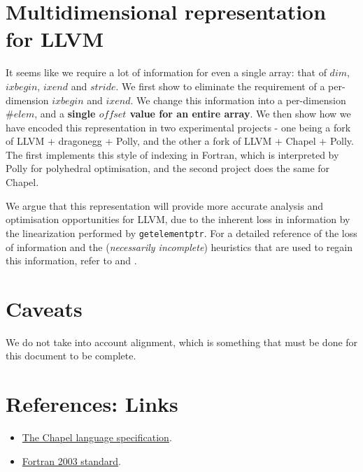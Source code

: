 \documentclass{article}
\newcommand{\gep}{\texttt{getelementptr}}
\begin{document}
\section{Multidimensional representation for LLVM}
It seems like we require a lot of information for even a single array:
that of $dim$, $ixbegin$, $ixend$ and $stride$.  We first show
to eliminate the requirement of a per-dimension $ixbegin$ and $ixend$. We
change this information into a per-dimension $\#elem$, and a 
\textbf{single $offset$ value for an entire array}. We then show
how we have encoded this representation in two experimental projects -
one being a fork of LLVM + dragonegg + Polly, and the other a fork of
LLVM + Chapel + Polly. The first implements this style of indexing in Fortran,
which is interpreted by Polly for polyhedral optimisation, and the second
project does the same for Chapel.

We argue that this representation will provide more accurate analysis and
optimisation opportunities for LLVM, due to the inherent loss in information
by the linearization performed by \gep. For a detailed reference of 
the loss of information and the (\textit{necessarily incomplete}) heuristics
that are used to regain this information, refer to \cite{grosser2015optimistic}
and \cite{maslov1992delinearization}.




\section{Caveats}
We do not take into account alignment, which is something that must be done
for this document to be complete.

\section{References: Links}

\begin{itemize}
    \item \href{https://chapel-lang.org/docs/1.13/_downloads/chapelLanguageSpec.pdf}{The Chapel language specification}.
    \item \href{http://www.j3-fortran.org/doc/year/04/04-007.pdf}{Fortran 2003 standard}.
\end{itemize}


\end{document}
